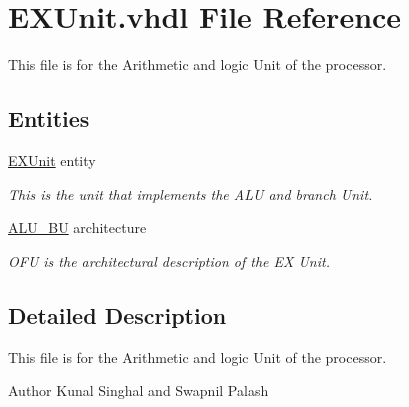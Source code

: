 \hypertarget{_e_x_unit_8vhdl}{\section{E\-X\-Unit.\-vhdl File Reference}
\label{_e_x_unit_8vhdl}
}


This file is for the Arithmetic and logic Unit of the processor.  


\subsection*{Entities}
\begin{DoxyCompactItemize}
\item 
\hyperlink{class_e_x_unit}{E\-X\-Unit} entity
\begin{DoxyCompactList}\small\item\em This is the unit that implements the A\-L\-U and branch Unit. \end{DoxyCompactList}\item 
\hyperlink{class_e_x_unit_1_1_a_l_u___b_u}{A\-L\-U\-\_\-\-B\-U} architecture
\begin{DoxyCompactList}\small\item\em O\-F\-U is the architectural description of the E\-X Unit. \end{DoxyCompactList}\end{DoxyCompactItemize}


\subsection{Detailed Description}
This file is for the Arithmetic and logic Unit of the processor. \begin{DoxyAuthor}{Author}
Kunal Singhal and Swapnil Palash 
\end{DoxyAuthor}
